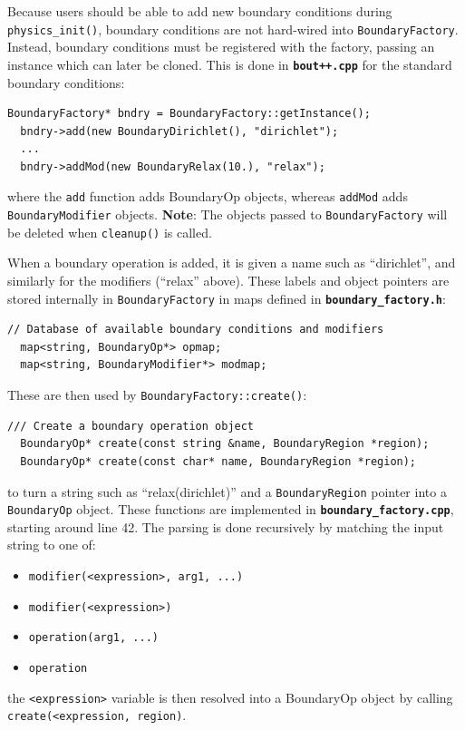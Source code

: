 \documentclass[12pt]{article}
\newcommand{\code}[1]{\texttt{#1}}
\newcommand{\file}[1]{\texttt{\bf #1}}
\begin{document}
Because users should be able to add new boundary conditions during
\code{physics\_init()}, boundary conditions are not hard-wired into
\code{BoundaryFactory}. Instead, boundary conditions must be registered
with the factory, passing an instance which can later be cloned. This
is done in \file{bout++.cpp} for the standard boundary conditions:
\begin{lstlisting}[firstnumber=258]
  BoundaryFactory* bndry = BoundaryFactory::getInstance();
  bndry->add(new BoundaryDirichlet(), "dirichlet");
  ...
  bndry->addMod(new BoundaryRelax(10.), "relax");
\end{lstlisting}
where the \code{add} function adds BoundaryOp objects, whereas
\code{addMod} adds \code{BoundaryModifier} objects. {\bf Note}: The
objects passed to \code{BoundaryFactory} will be deleted when \code{cleanup()}
is called. 

When a boundary operation is added, it is given a name
such as ``dirichlet'', and similarly for the modifiers (``relax'' above).
These labels and object pointers are stored internally in \code{BoundaryFactory}
in maps defined in \file{boundary\_factory.h}:
\begin{lstlisting}[firstnumber=43]
  // Database of available boundary conditions and modifiers
  map<string, BoundaryOp*> opmap;
  map<string, BoundaryModifier*> modmap;
\end{lstlisting}
These are then used by \code{BoundaryFactory::create()}:
\begin{lstlisting}[firstnumber=24]
  /// Create a boundary operation object
  BoundaryOp* create(const string &name, BoundaryRegion *region);
  BoundaryOp* create(const char* name, BoundaryRegion *region);
\end{lstlisting}
to turn a string such as ``relax(dirichlet)'' and a \code{BoundaryRegion}
pointer into a \code{BoundaryOp} object. These functions are implemented
in \file{boundary\_factory.cpp}, starting around line 42. The parsing is
done recursively by matching the input string to one of:
\begin{itemize}
\item \code{modifier(<expression>, arg1, ...)}
\item \code{modifier(<expression>)}
\item \code{operation(arg1, ...)}
\item \code{operation}
\end{itemize}
the \code{<expression>} variable is then resolved into a BoundaryOp
object by calling \code{create(<expression, region)}.
\end{document}
